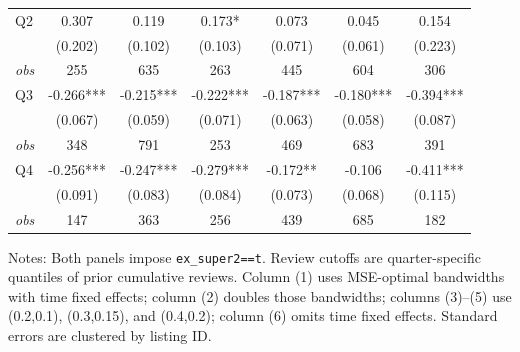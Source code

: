 \begin{table}[!htbp]
\begin{tabular}{lcccccc}
Q2 & 0.307 & 0.119 & 0.173* & 0.073 & 0.045 & 0.154 \\
 & (0.202) & (0.102) & (0.103) & (0.071) & (0.061) & (0.223) \\
\textit{obs} & 255 & 635 & 263 & 445 & 604 & 306 \\
Q3 & -0.266*** & -0.215*** & -0.222*** & -0.187*** & -0.180*** & -0.394*** \\
 & (0.067) & (0.059) & (0.071) & (0.063) & (0.058) & (0.087) \\
\textit{obs} & 348 & 791 & 253 & 469 & 683 & 391 \\
Q4 & -0.256*** & -0.247*** & -0.279*** & -0.172** & -0.106 & -0.411*** \\
 & (0.091) & (0.083) & (0.084) & (0.073) & (0.068) & (0.115) \\
\textit{obs} & 147 & 363 & 256 & 439 & 685 & 182 \\
\bottomrule
\end{tabular}
\begin{minipage}{0.98\textwidth}\footnotesize
Notes: Both panels impose \texttt{ex\_super2==t}. Review cutoffs are quarter-specific quantiles of prior cumulative reviews. Column (1) uses MSE-optimal bandwidths with time fixed effects; column (2) doubles those bandwidths; columns (3)--(5) use (0.2,0.1), (0.3,0.15), and (0.4,0.2); column (6) omits time fixed effects. Standard errors are clustered by listing ID.
\end{minipage}
\end{table}

